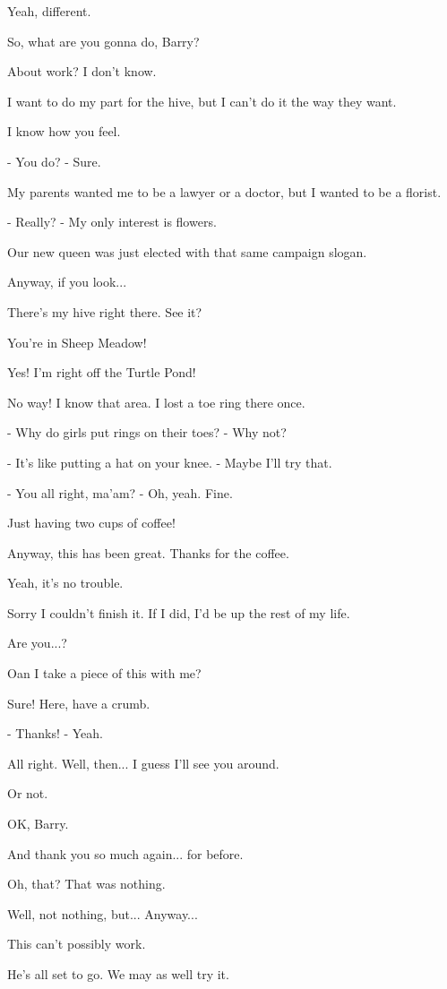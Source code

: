 \documentclass[journal]{IEEEtran}
\begin{document}
  
Yeah, different.

  
So, what are you gonna do, Barry?

  
About work? I don't know.

  
I want to do my part for the hive,
but I can't do it the way they want.

  
I know how you feel.

  
- You do?
- Sure.

  
My parents wanted me to be a lawyer or
a doctor, but I wanted to be a florist.

  
- Really?
- My only interest is flowers.

  
Our new queen was just elected
with that same campaign slogan.

  
Anyway, if you look...

  
There's my hive right there. See it?

  
You're in Sheep Meadow!

  
Yes! I'm right off the Turtle Pond!

  
No way! I know that area.
I lost a toe ring there once.

  
- Why do girls put rings on their toes?
- Why not?

  
- It's like putting a hat on your knee.
- Maybe I'll try that.

  
- You all right, ma'am?
- Oh, yeah. Fine.

  
Just having two cups of coffee!

  
Anyway, this has been great.
Thanks for the coffee.

  
Yeah, it's no trouble.

  
Sorry I couldn't finish it. If I did,
I'd be up the rest of my life.

  
Are you...?

  
Oan I take a piece of this with me?

  
Sure! Here, have a crumb.

  
- Thanks!
- Yeah.

  
All right. Well, then...
I guess I'll see you around.

  
Or not.

  
OK, Barry.

  
And thank you
so much again... for before.

  
Oh, that? That was nothing.

  
Well, not nothing, but... Anyway...

  
This can't possibly work.

  
He's all set to go.
We may as well try it.
\end{document}
